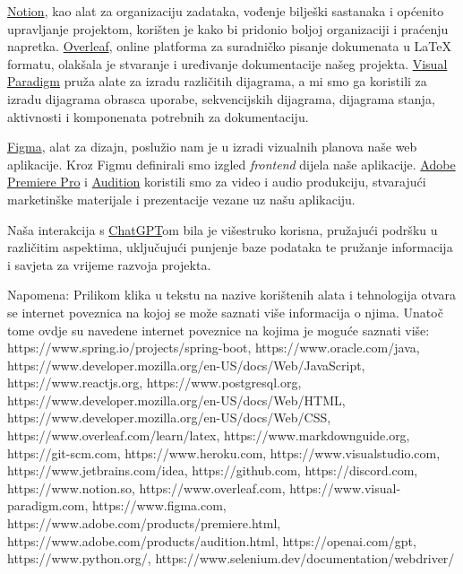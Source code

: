 \href{https://www.notion.so}{Notion}, kao alat za organizaciju zadataka, vođenje bilješki sastanaka i općenito upravljanje projektom, korišten je kako bi pridonio boljoj organizaciji i praćenju napretka. \href{https://www.overleaf.com}{Overleaf}, online platforma za suradničko pisanje dokumenata u LaTeX formatu, olakšala je stvaranje i uređivanje dokumentacije našeg projekta.
\href{https://www.visual-paradigm.com}{Visual Paradigm} pruža alate za izradu različitih dijagrama, a mi smo ga koristili za izradu dijagrama obrasca uporabe, sekvencijskih dijagrama, dijagrama stanja, aktivnosti i komponenata potrebnih za dokumentaciju. 

\href{https://www.figma.com}{Figma}, alat za dizajn, poslužio nam je u izradi vizualnih planova naše web aplikacije. Kroz Figmu definirali smo izgled \textit{frontend} dijela naše aplikacije. \href{https://www.adobe.com/products/premiere.html}{Adobe Premiere Pro} i \href{https://www.adobe.com/products/audition.html}{Audition} koristili smo za video i audio produkciju, stvarajući marketinške materijale i prezentacije vezane uz našu aplikaciju.

Naša interakcija s \href{https://openai.com/gpt}{ChatGPT}om bila je višestruko korisna, pružajući podršku u različitim aspektima, uključujući punjenje baze podataka te pružanje informacija i savjeta za vrijeme razvoja projekta. 


 		Napomena: Prilikom klika u tekstu na nazive korištenih alata i tehnologija otvara se internet poveznica na kojoj se može saznati više informacija o njima. 
		Unatoč tome ovdje su navedene internet poveznice na kojima je moguće saznati više:  
		https://www.spring.io/projects/spring-boot, \newline https://www.oracle.com/java,  
		https://www.developer.mozilla.org/en-US/docs/Web/JavaScript, 
		https://www.reactjs.org, https://www.postgresql.org, 
		\newline https://www.developer.mozilla.org/en-US/docs/Web/HTML,
		\newline https://www.developer.mozilla.org/en-US/docs/Web/CSS, 
		\newline https://www.overleaf.com/learn/latex,  
		\newline https://www.markdownguide.org, https://git-scm.com, 
		https://www.heroku.com, https://www.visualstudio.com, 
		\newline https://www.jetbrains.com/idea, https://github.com, 
		\newline https://discord.com, https://www.notion.so, 
		https://www.overleaf.com, 
		\newline https://www.visual-paradigm.com, https://www.figma.com, 
		\newline https://www.adobe.com/products/premiere.html, 
		\newline https://www.adobe.com/products/audition.html, 
		\newline https://openai.com/gpt, https://www.python.org/,
		\newline https://www.selenium.dev/documentation/webdriver/

